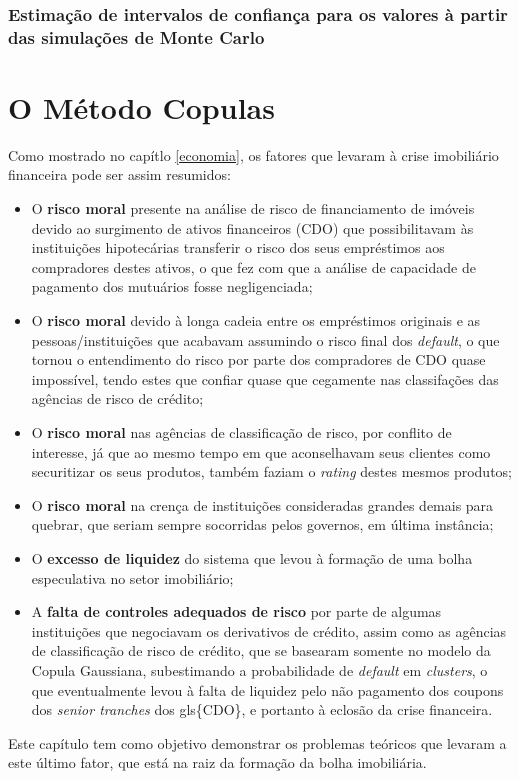 \documentclass[
	12pt,				%
	oneside,			%
	a4paper,			%
	chapter=TITLE,		%
	section=TITLE,		%
	english,			%
	brazil				%
	]{abntex2}
\begin{document}
\subsection{Estimação de intervalos de confiança para os valores à
partir das simulações de Monte
Carlo}\label{estimauxe7uxe3o-de-intervalos-de-confianuxe7a-para-os-valores-uxe0-partir-das-simulauxe7uxf5es-de-monte-carlo}

\hypertarget{copulas}{\chapter{O Método Copulas}\label{copulas}}

Como mostrado no capítlo \ref{economia}, os fatores que levaram à crise
imobiliário financeira pode ser assim resumidos:
\begin{itemize}
\item
  O \textbf{risco moral} presente na análise de risco de financiamento
  de imóveis devido ao surgimento de ativos financeiros (\gls{CDO}) que
  possibilitavam às instituições hipotecárias transferir o risco dos
  seus empréstimos aos compradores destes ativos, o que fez com que a
  análise de capacidade de pagamento dos mutuários fosse negligenciada;
\item
  O \textbf{risco moral} devido à longa cadeia entre os empréstimos
  originais e as pessoas/instituições que acabavam assumindo o risco
  final dos \emph{default}, o que tornou o entendimento do risco por
  parte dos compradores de \gls{CDO} quase impossível, tendo estes que
  confiar quase que cegamente nas classifações das agências de risco de
  crédito;
\item
  O \textbf{risco moral} nas agências de classificação de risco, por
  conflito de interesse, já que ao mesmo tempo em que aconselhavam seus
  clientes como securitizar os seus produtos, também faziam o
  \emph{rating} destes mesmos produtos;
\item
  O \textbf{risco moral} na crença de instituições consideradas grandes
  demais para quebrar, que seriam sempre socorridas pelos governos, em
  última instância;
\item
  O \textbf{excesso de liquidez} do sistema que levou à formação de uma
  bolha especulativa no setor imobiliário;
\item
  A \textbf{falta de controles adequados de risco} por parte de algumas
  instituições que negociavam os derivativos de crédito, assim como as
  agências de classificação de risco de crédito, que se basearam somente
  no modelo da Copula Gaussiana, subestimando a probabilidade de
  \emph{default} em \emph{clusters}, o que eventualmente levou à falta
  de liquidez pelo não pagamento dos coupons dos \emph{senior tranches}
  dos gls\{CDO\}, e portanto à eclosão da crise financeira.
\end{itemize}
Este capítulo tem como objetivo demonstrar os problemas teóricos que
levaram a este último fator, que está na raiz da formação da bolha
imobiliária.
\end{document}
